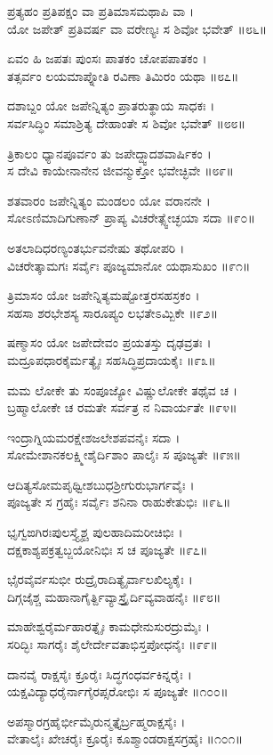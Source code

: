 ಪ್ರತ್ಯಹಂ ಪ್ರತಿಪಕ್ಷಂ ವಾ ಪ್ರತಿಮಾಸಮಥಾಪಿ ವಾ ।\\
ಯೋ ಜಪೇತ್ ಪ್ರತಿವರ್ಷ ವಾ ವರೇಣ್ಯಃ ಸ ಶಿವೋ ಭವೇತ್ ॥೮೬॥

ಏವಂ ಹಿ ಜಪತಃ ಪುಂಸಃ ಪಾತಕಂ ಚೋಪಪಾತಕಂ ।\\
ತತ್ಸರ್ವಂ ಲಯಮಾಪ್ನೋತಿ ರವಿಣಾ ತಿಮಿರಂ ಯಥಾ ॥೮೭॥

ದಶಾಬ್ದಂ ಯೋ ಜಪೇನ್ನಿತ್ಯಂ ಪ್ರಾತರುತ್ಥಾಯ ಸಾಧಕಃ ।\\
ಸರ್ವಸಿದ್ಧಿಂ ಸಮಾಶ್ರಿತ್ಯ ದೇಹಾಂತೇ ಸ ಶಿವೋ ಭವೇತ್ ॥೮೮॥

ತ್ರಿಕಾಲಂ ಧ್ಯಾನಪೂರ್ವಂ ತು ಜಪೇದ್ದ್ವಾದಶವಾರ್ಷಿಕಂ ।\\
ಸ ದೇವಿ ಕಾಯೇನಾನೇನ ಜೀವನ್ಮುಕ್ತೋ ಭವೇಚ್ಛಿವೇ ॥೮೯॥

ಶತವಾರಂ ಜಪೇನ್ನಿತ್ಯಂ ಮಂಡಲಂ ಯೋ ವರಾನನೇ ।\\
ಸೋಽಣಿಮಾದಿಗುಣಾನ್ ಪ್ರಾಪ್ಯ ವಿಚರೇತ್ಸ್ವೇಚ್ಛಯಾ ಸದಾ ॥೯೦॥

ಅತಲಾದಿಧರಣ್ಯಂತರ್ಭುವನೇಷು ತಥೋಪರಿ ।\\
ವಿಚರೇತ್ಕಾಮಗಃ ಸರ್ವೈಃ ಪೂಜ್ಯಮಾನೋ ಯಥಾಸುಖಂ ॥೯೧॥

ತ್ರಿಮಾಸಂ ಯೋ ಜಪೇನ್ನಿತ್ಯಮಷ್ಟೋತ್ತರಸಹಸ್ರಕಂ ।\\
ಸಹಸಾ ಶರಭೇಶಸ್ಯ ಸಾರೂಪ್ಯಂ ಲಭತೇಽಮ್ಬಿಕೇ ॥೯೨॥

ಷಣ್ಮಾಸಂ ಯೋ ಜಪೇದೇವಂ ಪ್ರಯತಸ್ತು ದೃಢವ್ರತಃ ।\\
ಮದ್ರೂಪಧಾರಕೈರ್ಮತ್ಯೈಃ ಸಹಸಿದ್ಧಿಪ್ರದಾಯಕೈಃ ॥೯೩॥

ಮಮ ಲೋಕೇ ತು ಸಂಪೂಜ್ಯೋ ವಿಷ್ಣುಲೋಕೇ ತಥೈವ ಚ ।\\
ಬ್ರಹ್ಮಾಲೋಕೇ ಚ ರಮತೇ ಸರ್ವತ್ರ ನ ನಿವಾರ್ಯತೇ ॥೯೪॥

ಇಂದ್ರಾಗ್ನಿಯಮರಕ್ಷೇಶಜಲೇಶಪವನೈಃ ಸದಾ ।\\
ಸೋಮೇಶಾನಕಲಕ್ಷ್ಮೀಶೈರ್ದಿಶಾಂ ಪಾಲೈಃ ಸ ಪೂಜ್ಯತೇ ॥೯೫॥

ಆದಿತ್ಯಸೋಮಪೃಥ್ವೀಶಬುಧಶ್ರೀಗುರುಭಾರ್ಗವೈಃ ।\\
ಪೂಜ್ಯತೇ ಸ ಗ್ರಹೈಃ ಸರ್ವೈಃ ಶನಿನಾ ರಾಹುಕೇತುಭಿಃ ॥೯೬॥

ಭೃಗ್ವಙಗಿರಃಪುಲಸ್ತ್ಯೈಶ್ಚ ಪುಲಹಾದಿಮರೀಚಿಭಿಃ ।\\
ದಕ್ಷಕಾಶ್ಯಪಕ್ರತ್ವಬ್ಜಯೋನಿಭಿಃ ಸ ಚ ಪೂಜ್ಯತೇ ॥೯೭॥

ಭೈರವೈರ್ವಸುಭೀ ರುದ್ರೈರಾದಿತ್ಯೈರ್ವಾಲಖಿಲ್ಯಕೈಃ ।\\
ದಿಗ್ಗಜೈಶ್ಚ ಮಹಾನಾಗೈರ್ತ್ದಿವ್ಯಾಸ್ತ್ರೈರ್ದಿವ್ಯವಾಹನೈಃ ॥೯೮॥

ಮಾಹೇಶ್ವರೈರ್ಮಹಾರತ್ನೈಃ ಕಾಮಧೇನುಸುರದ್ರುಮೈಃ ।\\
ಸರಿದ್ಭಿಃ ಸಾಗರೈಃ ಶೈಲೇರ್ದೇವತಾಭಿಸ್ತಪೋಧನೈಃ ॥೯೯॥

ದಾನವೈ ರಾಕ್ಷಸೈಃ ಕ್ರೂರೈಃ ಸಿದ್ಧಗಂಧರ್ವಕಿನ್ನರೈಃ ।\\
ಯಕ್ಷವಿದ್ಯಾಧರೈರ್ನಾಗೈರಪ್ಸರೋಭಿಃ ಸ ಪೂಜ್ಯತೇ ॥೧೦೦॥

ಅಪಸ್ಮಾರಗ್ರಹೈರ್ಭೀಮೈರುನ್ಮತ್ತೈರ್ಬ್ರಹ್ಮರಾಕ್ಷಸೈಃ ।\\
ವೇತಾಲೈಃ ಖೇಚರೈಃ ಕ್ರೂರೈಃ ಕೂಶ್ಮಾಂಡರಾಕ್ಷಸಗ್ರಹೈಃ ॥೧೦೧॥

